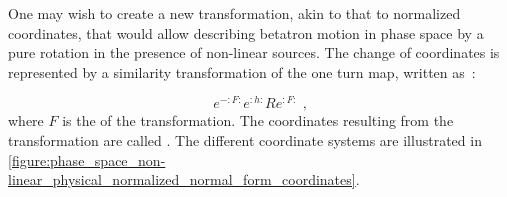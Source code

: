 One may wish to create a new transformation, akin to that to normalized coordinates, that would allow describing betatron motion in phase space by a pure rotation in the presence of non-linear sources.
The change of coordinates is represented by a similarity transformation of the one turn map, written as~\cite{PHD:Tomas}:

\begin{equation}
    e^{-:F:} e^{:h:} R e^{:F:} \text{ ,}
    \label{equation:normal_form_transformation}
\end{equation}
where \(F\) is the  of the transformation.
The coordinates resulting from the transformation are called .
The different coordinate systems are illustrated in \cref{figure:phase_space_non-linear_physical_normalized_normal_form_coordinates}.

